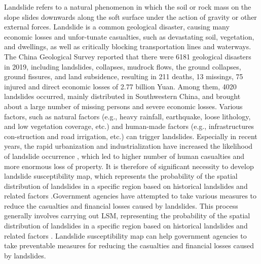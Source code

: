 \documentclass[a4paper,fleqn]{cas-sc}
\begin{document}
Landslide refers to a natural phenomenon in which the soil or rock mass on the slope slides downwards along the soft surface under the action of gravity or other external forces.
Landslide is a common geological disaster, causing many economic losses and unfor-tunate casualties, such as devastating soil, vegetation, and dwellings, as well as critically blocking transportation lines and waterways\citep{Abuzied2016JoMS, 2017Chenp147160}.
The China Geological Survey reported that there were 6181 geological disasters in 2019, including landslides, collapses, mudrock flows, the ground collapses, ground fissures, and land subsidence, resulting in 211 deaths, 13 missings, 75 injured and direct economic losses of 2.77 billion Yuan.
Among them, 4020 landslides occurred, mainly distributed in Southwestern China, and brought about a large number of missing persons and severe economic losses.
Various factors, such as natural factors (e.g., heavy rainfall, earthquake, loose lithology, and low vegetation coverage, etc.) and human-made factors (e.g., infrastructures con-struction and road irrigation, etc.) can trigger landslides\citep{2018Wildep97104}.
Especially in recent years, the rapid urbanization and industrialization have increased the likelihood of landslide occurrence \citep{2020Kocamanp118}, which led to higher number of human casualties and more enormous loss of property. 
It is therefore of significant necessity to develop landslide susceptibility map, which represents the probability of the spatial distribution of landslides in a specific region based on historical landslides and related factors \citep{2016Yup487487,Song2018}.Government agencies have attempted to take various measures to reduce the casualties and financial losses caused by landslides. 
This process generally involves carrying out LSM, representing the probability of the spatial distribution of landslides in a specific region based on historical landslides and related factors \citep{2016Yup487487,Song2018}. 
Landslide susceptibility map can help government agencies to take preventable measures for reducing the casualties and financial losses caused by landslides.
\end{document}
